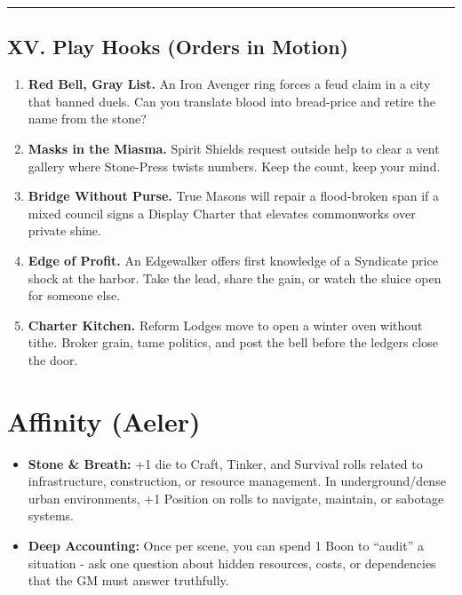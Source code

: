 \documentclass[11pt]{article}
\begin{document}
\medskip\hrule\medskip

\subsection{XV. Play Hooks (Orders in Motion)}

\begin{enumerate}[leftmargin=*]
  \item \textbf{Red Bell, Gray List.} An Iron Avenger ring forces a feud claim in a city that banned duels. Can you translate blood into bread-price and retire the name from the stone?
  \item \textbf{Masks in the Miasma.} Spirit Shields request outside help to clear a vent gallery where Stone-Press twists numbers. Keep the count, keep your mind.
  \item \textbf{Bridge Without Purse.} True Masons will repair a flood-broken span if a mixed council signs a Display Charter that elevates commonworks over private shine.
  \item \textbf{Edge of Profit.} An Edgewalker offers first knowledge of a Syndicate price shock at the harbor. Take the lead, share the gain, or watch the sluice open for someone else.
  \item \textbf{Charter Kitchen.} Reform Lodges move to open a winter oven without tithe. Broker grain, tame politics, and post the bell before the ledgers close the door.
\end{enumerate}

\section*{Affinity (Aeler)}
\begin{itemize}
  \item \textbf{Stone \& Breath:} +1 die to Craft, Tinker, and Survival rolls related to infrastructure, construction, or resource management. In underground/dense urban environments, +1 Position on rolls to navigate, maintain, or sabotage systems.
  \item \textbf{Deep Accounting:} Once per scene, you can spend 1 Boon to ``audit'' a situation - ask one question about hidden resources, costs, or dependencies that the GM must answer truthfully.
\end{itemize}
\end{document}
